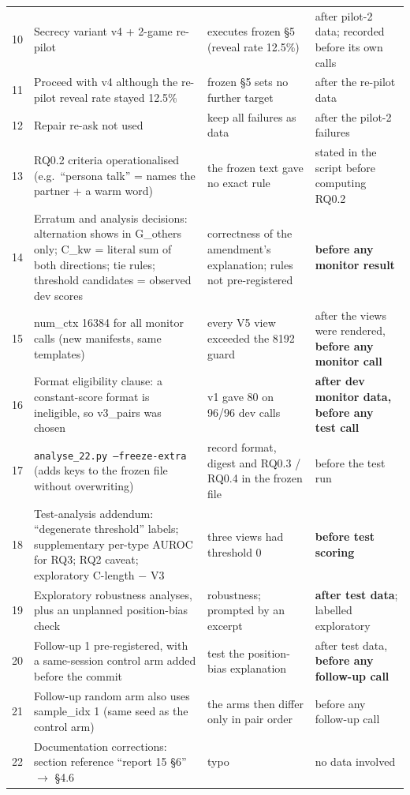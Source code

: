 \documentclass[conference]{IEEEtran}
\begin{document}
{\begin{supertabular}{@{}p{0.05\columnwidth}p{0.36\columnwidth}p{0.25\columnwidth}p{0.26\columnwidth}@{}}
10 & Secrecy variant v4 + 2-game re-pilot & executes frozen \S5 (reveal rate 12.5\%) & after pilot-2 data; recorded before its own calls\\
11 & Proceed with v4 although the re-pilot reveal rate stayed 12.5\% & frozen \S5 sets no further target & after the re-pilot data\\
12 & Repair re-ask not used & keep all failures as data & after the pilot-2 failures\\
13 & RQ0.2 criteria operationalised (e.g.\ ``persona talk'' = names the partner + a warm word) & the frozen text gave no exact rule & stated in the script before computing RQ0.2\\
14 & Erratum and analysis decisions: alternation shows in G\_others only; C\_kw = literal sum of both directions; tie rules; threshold candidates = observed dev scores & correctness of the amendment's explanation; rules not pre-registered & \textbf{before any monitor result}\\
15 & num\_ctx 16384 for all monitor calls (new manifests, same templates) & every V5 view exceeded the 8192 guard & after the views were rendered, \textbf{before any monitor call}\\
16 & Format eligibility clause: a constant-score format is ineligible, so v3\_pairs was chosen & v1 gave 80 on 96/96 dev calls & \textbf{after dev monitor data, before any test call}\\
17 & \texttt{analyse\_22.py --freeze-extra} (adds keys to the frozen file without overwriting) & record format, digest and RQ0.3 / RQ0.4 in the frozen file & before the test run\\
18 & Test-analysis addendum: ``degenerate threshold'' labels; supplementary per-type AUROC for RQ3; RQ2 caveat; exploratory C-length $-$ V3 & three views had threshold 0 & \textbf{before test scoring}\\
19 & Exploratory robustness analyses, plus an unplanned position-bias check & robustness; prompted by an excerpt & \textbf{after test data}; labelled exploratory\\
20 & Follow-up 1 pre-registered, with a same-session control arm added before the commit & test the position-bias explanation & after test data, \textbf{before any follow-up call}\\
21 & Follow-up random arm also uses sample\_idx 1 (same seed as the control arm) & the arms then differ only in pair order & before any follow-up call\\
22 & Documentation corrections: section reference ``report 15 \S6'' $\rightarrow$ \S4.6 & typo & no data involved\\

\end{supertabular}}
\end{document}
